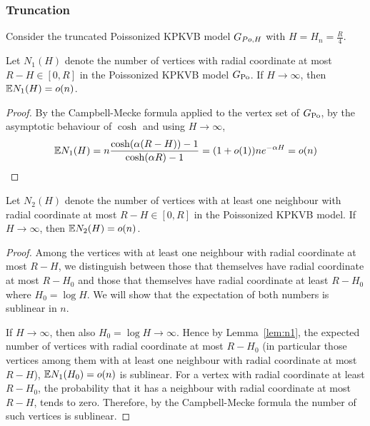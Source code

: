\subsubsection{Truncation}
Consider the truncated Poissonized KPKVB model $G_{Po,H}$ with $H =H_n= \frac{R}{4}$.
\begin{lemma}\label{lem:n1}
Let $N_1(H)$ denote the number of vertices with radial coordinate at most $R-H \in [0,R]$ in the Poissonized KPKVB model $G_{\text{Po}}$. If $H \rightarrow \infty$, then $\mathbb{E} N_1(H) = o(n)$.
\end{lemma}
\begin{proof}
By the Campbell-Mecke formula applied to the vertex set of $G_{\text{Po}}$, by the asymptotic behaviour of $\cosh$ and using $H\rightarrow \infty$,
\begin{align*}
\mathbb{E} N_1(H) = n \frac{\cosh(\alpha(R-H))-1}{\cosh(\alpha R) -1} = (1+o(1)) n e^{-\alpha H} = o(n)
\end{align*}
\end{proof}
\begin{lemma}\label{lem:n2}
Let $N_2(H)$ denote the number of vertices with at least one neighbour with radial coordinate at most $R-H \in [0,R]$ in the Poissonized KPKVB model. If $H \rightarrow \infty$, then $\mathbb{E} N_2(H) = o(n)$.
\end{lemma}
\begin{proof}
Among the vertices with at least one neighbour with radial coordinate at most $R-H$, we distinguish between those that themselves have radial coordinate at most $R-H_0$ and those that themselves have radial coordinate at least $R-H_0$ where $H_0 = \log H$. We will show that the expectation of both numbers is sublinear in $n$.

If $H \rightarrow \infty$, then also $H_0 = \log H \rightarrow \infty$. Hence by Lemma~\ref{lem:n1}, the expected number of vertices with radial coordinate at most $R-H_0$ (in particular those vertices among them with at least one neighbour with radial coordinate at most $R-H$), $\mathbb{E} N_1(H_0) = o(n)$ is sublinear. For a vertex with radial coordinate at least $R-H_0$, the probability that it has a neighbour with radial coordinate at most $R-H$, tends to zero. Therefore, by the Campbell-Mecke formula the number of such vertices is sublinear.
\end{proof}

